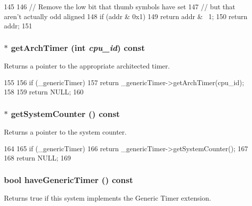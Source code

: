 \begin{DoxyCode}
145     {
146         // Remove the low bit that thumb symbols have set
147         // but that aren't actually odd aligned
148         if (addr & 0x1)
149             return addr & ~1;
150         return addr;
151     }
\end{DoxyCode}
\hypertarget{classArmSystem_af8bdff642693841d42bfdb92c78729a3}{
\subsubsection[{getArchTimer}]{ $\ast$ getArchTimer (int {\em cpu\_\-id}) const}}
\label{classArmSystem_af8bdff642693841d42bfdb92c78729a3}
Returns a pointer to the appropriate architected timer. 


\begin{DoxyCode}
155 {
156     if (_genericTimer) {
157         return _genericTimer->getArchTimer(cpu_id);
158     }
159     return NULL;
160 }
\end{DoxyCode}
\hypertarget{classArmSystem_af76ffe466ccc286510b4747521fabcfe}{
\subsubsection[{getSystemCounter}]{ $\ast$ getSystemCounter () const}}
\label{classArmSystem_af76ffe466ccc286510b4747521fabcfe}
Returns a pointer to the system counter. 


\begin{DoxyCode}
164 {
165     if (_genericTimer) {
166         return _genericTimer->getSystemCounter();
167     }
168     return NULL;
169 }
\end{DoxyCode}
\hypertarget{classArmSystem_aecff777f050f73e02052a0a3691e0303}{
\subsubsection[{haveGenericTimer}]{\setlength{\rightskip}{0pt plus 5cm}bool haveGenericTimer () const}}
\label{classArmSystem_aecff777f050f73e02052a0a3691e0303}
Returns true if this system implements the Generic Timer extension. 



